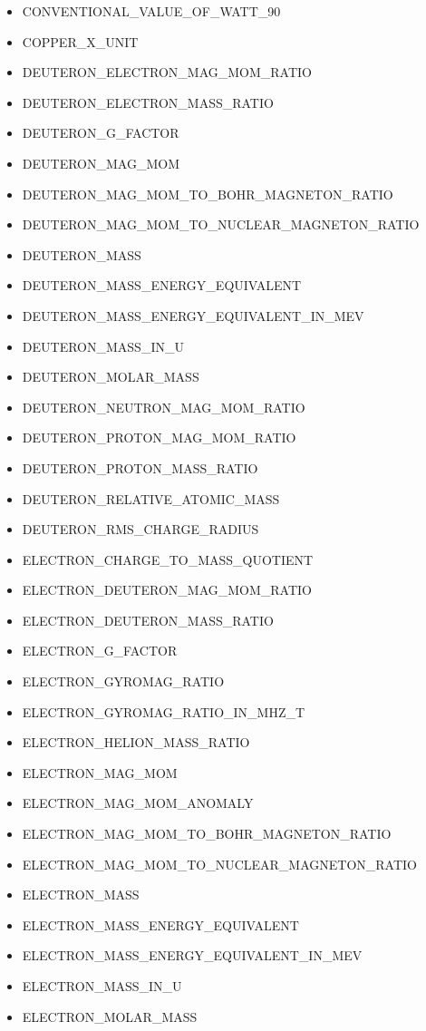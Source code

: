 \begin{itemize}
\item CONVENTIONAL\_VALUE\_OF\_WATT\_90
\item COPPER\_X\_UNIT
\item DEUTERON\_ELECTRON\_MAG\_MOM\_RATIO
\item DEUTERON\_ELECTRON\_MASS\_RATIO
\item DEUTERON\_G\_FACTOR
\item DEUTERON\_MAG\_MOM
\item DEUTERON\_MAG\_MOM\_TO\_BOHR\_MAGNETON\_RATIO
\item DEUTERON\_MAG\_MOM\_TO\_NUCLEAR\_MAGNETON\_RATIO
\item DEUTERON\_MASS
\item DEUTERON\_MASS\_ENERGY\_EQUIVALENT
\item DEUTERON\_MASS\_ENERGY\_EQUIVALENT\_IN\_MEV
\item DEUTERON\_MASS\_IN\_U
\item DEUTERON\_MOLAR\_MASS
\item DEUTERON\_NEUTRON\_MAG\_MOM\_RATIO
\item DEUTERON\_PROTON\_MAG\_MOM\_RATIO
\item DEUTERON\_PROTON\_MASS\_RATIO
\item DEUTERON\_RELATIVE\_ATOMIC\_MASS
\item DEUTERON\_RMS\_CHARGE\_RADIUS
\item ELECTRON\_CHARGE\_TO\_MASS\_QUOTIENT
\item ELECTRON\_DEUTERON\_MAG\_MOM\_RATIO
\item ELECTRON\_DEUTERON\_MASS\_RATIO
\item ELECTRON\_G\_FACTOR
\item ELECTRON\_GYROMAG\_RATIO
\item ELECTRON\_GYROMAG\_RATIO\_IN\_MHZ\_T
\item ELECTRON\_HELION\_MASS\_RATIO
\item ELECTRON\_MAG\_MOM
\item ELECTRON\_MAG\_MOM\_ANOMALY
\item ELECTRON\_MAG\_MOM\_TO\_BOHR\_MAGNETON\_RATIO
\item ELECTRON\_MAG\_MOM\_TO\_NUCLEAR\_MAGNETON\_RATIO
\item ELECTRON\_MASS
\item ELECTRON\_MASS\_ENERGY\_EQUIVALENT
\item ELECTRON\_MASS\_ENERGY\_EQUIVALENT\_IN\_MEV
\item ELECTRON\_MASS\_IN\_U
\item ELECTRON\_MOLAR\_MASS

\end{itemize}
